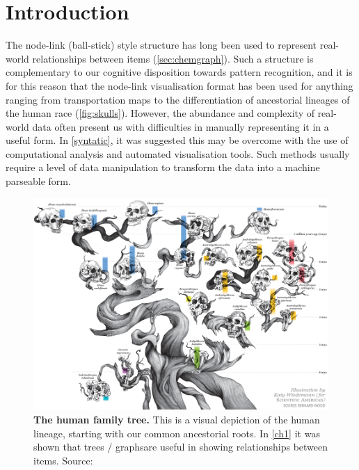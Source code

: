 
\section{Introduction}
The node-link (ball-stick) style structure has long been used to represent real-world relationships between items (\autoref{sec:chemgraph}). Such a structure is complementary to our cognitive disposition towards pattern recognition, and it is for this reason that the node-link visualisation format has been used for anything ranging from transportation maps \citep{beck} to the differentiation of ancestorial lineages of the human race (\autoref{fig:skulls}). However, the abundance and complexity of real-world data often present us with difficulties in manually representing it in a useful form. In \autoref{syntatic}, it was suggested this may be overcome with the use of computational analysis and automated visualisation tools. Such methods usually require a level of data manipulation to transform the data into a machine parseable form.

\begin{figure}[H]
     \centering
         \includegraphics[width=\textwidth]{figures_c3/humanskulls.png}

        \caption{\textbf{The human family tree.} This is a visual depiction of the human lineage, starting with our common ancestorial roots. In \autoref{ch1}  it was shown that trees / graphs\protect\footnotemark are useful in showing relationships between items. Source: \citep{skull}}
        \label{fig:skulls}
\end{figure}



